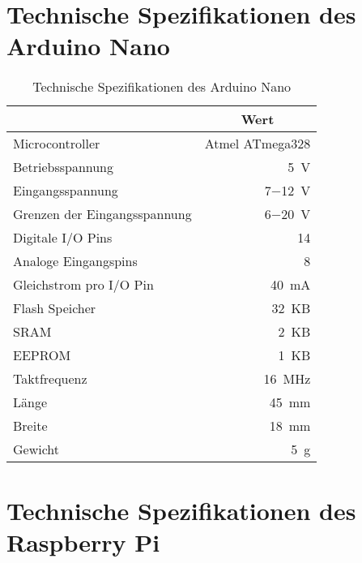 \clearpage{}

\section{Technische Spezifikationen des Arduino Nano}
\label{app:arduino}

\begin{table}[ht]
\caption{Technische Spezifikationen des Arduino Nano}
\begin{center}
\begin{tabular}{|l|r|}
\hline
\rowcolor{lightgray} \multicolumn{1}{|c|}{\textbf{Spezifikation}} & \multicolumn{1}{|c|}{\textbf{Wert}}\\
\hline
Microcontroller & Atmel ATmega328\\
\hline
Betriebsspannung & \SI{5}{\volt}\\
\hline
Eingangsspannung & \SI{7}{}$-$\SI{12}{\volt}\\
\hline
Grenzen der Eingangsspannung & \SI{6}{}$-$\SI{20}{\volt}\\
\hline
Digitale I/O Pins & \SI{14}{}\\
\hline
Analoge Eingangspins & \SI{8}{}\\
\hline
Gleichstrom pro I/O Pin & \SI{40}{\milli\ampere}\\
\hline
Flash Speicher & \SI{32}{KB}\\
\hline
SRAM & \SI{2}{KB} \\
\hline
EEPROM & \SI{1}{KB}\\
\hline
Taktfrequenz & \SI{16}{\mega\Hz}\\
\hline
Länge & \SI{45}{\milli\meter}\\
\hline
Breite & \SI{18}{\milli\meter}\\
\hline
Gewicht & \SI{5}{\gram}\\
\hline
\end{tabular}
\end{center}
\label{tab:arduino}
\end{table}

\clearpage{}

\section{Technische Spezifikationen des Raspberry Pi}
\label{app:raspberry}

